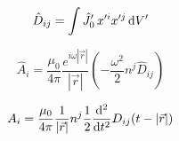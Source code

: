 \begin{equation}
    \hat{D}_{ij}=\int \hat{J}_{0}'\,x'^ix'^j\,\mathrm{d} V'
\end{equation}

\begin{equation}
    \hat{A}_i=\frac{\mu_0}{4\pi}\frac{e^{i\omega\left\lvert\vec{r}\right\rvert}}{\left\lvert\vec{r}\right\rvert}(-\frac{\omega^2}{2}n^j\hat{D}_{ij}
    )
\end{equation}

\begin{equation}
    {A}_i=\frac{\mu_0}{4\pi}\frac{1}{\left\lvert\vec{r}\right\rvert}n^j\frac{1}{2}\frac{\mathrm{d}^2}{\mathrm{d} t^2}D_{ij}(t-\left\lvert\vec{r}\right\rvert)
\end{equation}
